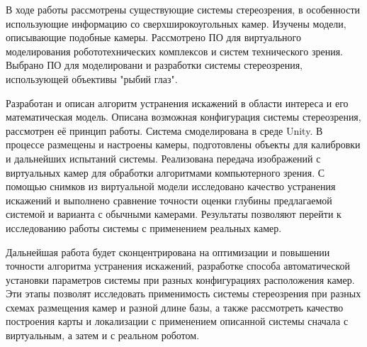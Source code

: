 
В ходе работы рассмотрены существующие системы стереозрения, в особенности использующие информацию
со сверхширокоугольных камер. Изучены модели, описывающие подобные камеры. Рассмотрено ПО для виртуального
 моделирования робототехнических комплексов и систем технического зрения. Выбрано ПО для моделировани и 
разработки системы стереозрения, использующей объективы "рыбий глаз". 

Разработан и описан алгоритм устранения искажений в области интереса и его математическая модель.   %
Описана возможная конфигурация системы стереозрения, рассмотрен её принцип работы. Система 
 смоделирована в среде Unity. В процессе размещены и настроены камеры, подготовлены объекты для калибровки и 
дальнейших испытаний системы. Реализована передача изображений с виртуальных камер для обработки алгоритмами
компьютерного зрения. С помощью снимков из виртуальной модели исследовано качество устранения искажений и выполнено
 сравнение точности оценки глубины предлагаемой системой и варианта с обычными камерами. Результаты позволяют 
 перейти к исследованию работы системы с применением реальных камер.  %

Дальнейшая работа будет сконцентрирована на оптимизации и повышении точности алгоритма устранения искажений,
разработке способа автоматической установки параметров системы при разных конфигурациях расположения камер. 
Эти этапы позволят исследовать применимость системы стереозрения при  разных схемах размещения камер и разной 
длине базы, а также рассмотреть качество построения карты и локализации с применением описанной 
системы сначала с виртуальным, а затем и с реальном роботом.  